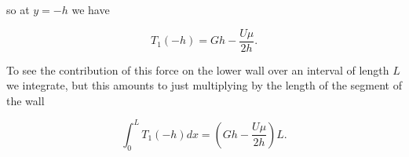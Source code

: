 \begin{itemize}
so at $y = -h$ we have

\begin{equation}\label{eqn:continuumMidTermReflection:810}
T_1(-h) = G h - \frac{U \mu}{2 h}.
\end{equation}

To see the contribution of this force on the lower wall over an interval of length $L$ we integrate, but this amounts to just multiplying by the length of the segment of the wall

\begin{equation}\label{eqn:continuumMidTermReflection:830}
\int_0^L T_1(-h) dx = \left( G h - \frac{U \mu}{2 h} \right) L.
\end{equation}

\end{itemize}
\EndArticle

